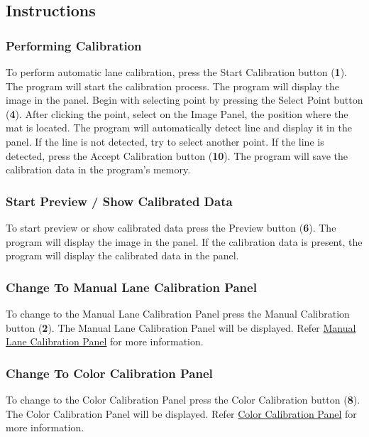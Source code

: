 \subsection{Instructions}

\subsubsection{Performing Calibration}

To perform automatic lane calibration, press the Start Calibration button (\textbf{1}). The program will start the calibration process. The program will display the image in the panel. Begin with selecting point by pressing the Select Point button (\textbf{4}). After clicking the point, select on the Image Panel, the position where the mat is located. The program will automatically detect line and display it in the panel. If the line is not detected, try to select another point. If the line is detected, press the Accept Calibration button (\textbf{10}). The program will save the calibration data in the program's memory.

\subsubsection{Start Preview / Show Calibrated Data}

To start preview or show calibrated data press the Preview button (\textbf{6}). The program will display the image in the panel. If the calibration data is present, the program will display the calibrated data in the panel.

\subsubsection{Change To Manual Lane Calibration Panel}

To change to the Manual Lane Calibration Panel press the Manual Calibration button (\textbf{2}). The Manual Lane Calibration Panel will be displayed. Refer \hyperref[sec:manual-lane-calibration-panel]{Manual Lane Calibration Panel} for more information.

\subsubsection{Change To Color Calibration Panel}

To change to the Color Calibration Panel press the Color Calibration button (\textbf{8}). The Color Calibration Panel will be displayed. Refer \hyperref[sec:color-calibration-panel]{Color Calibration Panel} for more information.

